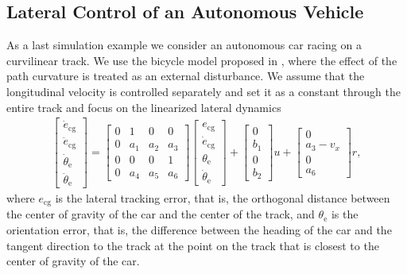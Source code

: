 \documentclass[journal,twoside,web,final]{ieeecolor}
\theoremstyle{definition}
\begin{document}
\subsection{Lateral Control of an Autonomous Vehicle} \label{section:simulation:lateral_control}

As a last simulation example we consider an autonomous car racing on a curvilinear track.
We use the bicycle model proposed in \cite[Section 4.12]{snider2009automatic}, 
where the effect of the path curvature is treated as an external disturbance.
We assume that the longitudinal velocity is controlled separately and set it as a constant through the entire track 
and focus on the linearized lateral dynamics
\begin{align}
\begin{bmatrix} \dot{e}_\text{cg} \\ \ddot{e}_\text{cg} \\ \dot{\theta}_\text{e} \\ \ddot{\theta}_\text{e} \end{bmatrix} = 
\begin{bmatrix} 0 & 1 & 0 & 0 \\ 0 & a_1 & a_2 & a_3 \\ 0 & 0 & 0 & 1 \\ 0 & a_4 & a_5 & a_6 \end{bmatrix} 
\begin{bmatrix} e_\text{cg} \\ \dot{e}_\text{cg} \\ \theta_\text{e} \\ \dot{\theta}_\text{e} \end{bmatrix}
+ \begin{bmatrix} 0 \\ b_1 \\ 0 \\ b_2 \end{bmatrix} u + \begin{bmatrix} 0 \\ a_3-v_x \\ 0 \\ a_6 \end{bmatrix} r,
\label{eq:simulation:car_model}
\end{align}
where $e_\text{cg}$ is the lateral tracking error, that is, 
the orthogonal distance between the center of gravity of the car and the center of the track,
and $\theta_\text{e}$ is the orientation error, that is, 
the difference between the heading of the car and the tangent direction to the track at the point on the track that is closest to the center of gravity of the car.
\end{document}
